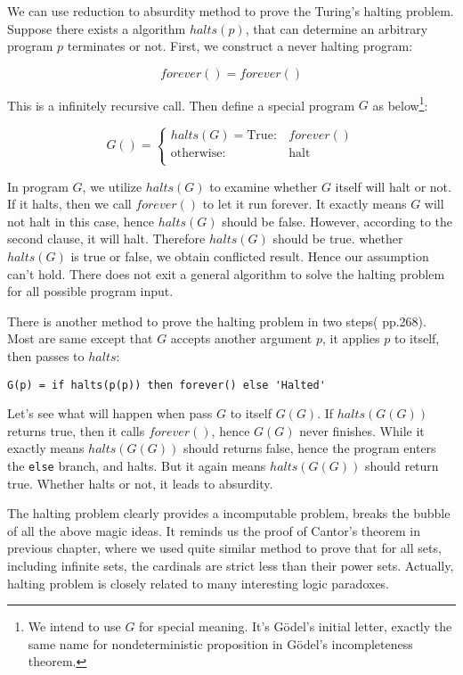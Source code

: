 \documentclass[b5paper]{article}
\begin{document}
We can use reduction to absurdity method to prove the Turing's halting problem. Suppose there exists a algorithm $halts(p)$, that can determine an arbitrary program $p$ terminates or not. First, we construct a never halting program:

\[
forever() = forever()
\]

This is a infinitely recursive call. Then define a special program $G$ as below\footnote{We intend to use $G$ for special meaning. It's Gödel's initial letter, exactly the same name for nondeterministic proposition in Gödel's incompleteness theorem.}:

\[
G() = \begin{cases}
halts(G) = \text{True}: & forever() \\
\text{otherwise}: & \text{halt} \\
\end{cases}
\]

In program $G$, we utilize $halts(G)$ to examine whether $G$ itself will halt or not. If it halts, then we call $forever()$ to let it run forever. It exactly means $G$ will not halt in this case, hence $halts(G)$ should be false. However, according to the second clause, it will halt. Therefore $halts(G)$ should be true. whether $halts(G)$ is true or false, we obtain conflicted result. Hence our assumption can't hold. There does not exit a general algorithm to solve the halting problem for all possible program input.

There is another method to prove the halting problem in two steps(\cite{SICP} pp.268). Most are same except that $G$ accepts another argument $p$, it applies $p$ to itself, then passes to $halts$:

\lstset{frame=single}
\begin{lstlisting}
G(p) = if halts(p(p)) then forever() else 'Halted'
\end{lstlisting}

Let's see what will happen when pass $G$ to itself $G(G)$. If $halts(G(G))$ returns true, then it calls $forever()$, hence $G(G)$ never finishes. While it exactly means $halts(G(G))$ should returns false, hence the program enters the \texttt{else} branch, and halts. But it again means $halts(G(G))$ should return true. Whether halts or not, it leads to absurdity.

The halting problem clearly provides a incomputable problem, breaks the bubble of all the above magic ideas. It reminds us the proof of Cantor's theorem in previous chapter, where we used quite similar method to prove that for all sets, including infinite sets, the cardinals are strict less than their power sets. Actually, halting problem is closely related to many interesting logic paradoxes.
\end{document}
